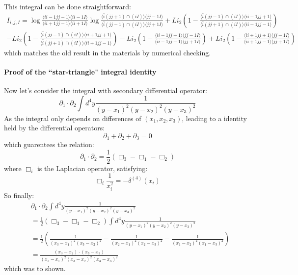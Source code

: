 \documentclass[10pt]{article}
\def\<{\langle}
\def\>{\rangle}
\begin{document}
This integral can be done straightforward:
\begin{equation}
\begin{split}
I_{i,j,I}=\log\frac{\<ii-1jj-1\>\<ii-1I\>}{\<ii+1jj-1\>\<ii+1I\>}\log\frac{\<\bar{i}(jj+1)\cap(iI)\>\<jj-1I\>}{\<\bar{i}(jj-1)\cap(iI)\>\<jj+1I\>}+Li_2(1-\frac{\<\bar{i}(jj-1)\cap(iI)\>\<ii-1jj+1\>}{\<\bar{i}(jj+1)\cap(iI)\>\<ii-1jj-1\>})\\
-Li_2(1-\frac{\<\bar{i}(jj-1)\cap(iI)\>\<ii+1jj+1\>}{\<\bar{i}(jj+1)\cap(iI)\>\<ii+1jj-1\>})-Li_2(1-\frac{\<ii-1jj+1\>\<jj-1I\>}{\<ii-1jj-1\>\<jj+1I\>})+Li_2(1-\frac{\<ii+1jj+1\>\<jj-1I\>}{\<ii+1jj-1\>\<jj+1I\>})
\end{split}
\end{equation}
which matches the old result in the materials by numerical checking.


\paragraph{Proof of the ``star-triangle" integral identity}
Now let's consider the integral with secondary differential operator:
\begin{equation}
\partial_1\cdot\partial_2\int d^4y\frac1{(y-x_1)^2(y-x_2)^2(y-x_3)^2}
\end{equation}
As the integral only depends on differences of $(x_1,x_2,x_3)$, leading to a identity held by the differential operators:
\begin{equation}
\partial_1+\partial_2+\partial_3=0
\end{equation} 
which guarentees the relation:
\begin{equation}
\partial_1\cdot\partial_2=\frac12(\Box_3-\Box_1-\Box_2)
\end{equation}
where $\Box_i$ is the Laplacian operator, satisfying:
\begin{equation}
\Box_i\frac1{x_i^2}=-\delta^{(4)}(x_i)
\end{equation}
So finally:
\begin{equation}
\begin{split}
&\partial_1\cdot\partial_2\int d^4y\frac1{(y-x_1)^2(y-x_2)^2(y-x_3)^2}\\
&=\frac12(\Box_3-\Box_1-\Box_2)\int d^4y\frac1{(y-x_1)^2(y-x_2)^2(y-x_3)^2}\\
&=\frac12(\frac1{(x_3-x_1)^2(x_3-x_2)^2}-\frac1{(x_2-x_1)^2(x_2-x_3)^2}-\frac1{(x_1-x_2)^2(x_1-x_3)^2})\\
&=\frac{(x_3-x_2)\cdot(x_3-x_1)}{(x_3-x_1)^2(x_3-x_2)^2(x_3-x_3)^2}
\end{split}
\end{equation}
which was to shown.
\end{document}
